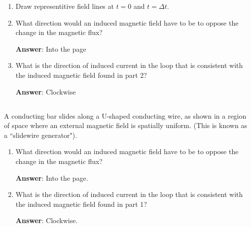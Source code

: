 \documentclass{article}
\begin{document}
\begin{enumerate}

  \item Draw representitive field lines at $t=0$ and $t=\Delta t$.

        \ifsolutions

        \else

        
        \fi

  \item What direction would an induced magnetic field have to be to oppose the change in the magnetic flux?

        \ifsolutions
        {\bf Answer}: Into the page
        \else

        \fi

  \item What is the direction of induced current in the loop that is consistent with the induced magnetic field found in part 2?

        \ifsolutions
        {\bf Answer}: Clockwise
        \else
        \fi

\end{enumerate}

\subsection{}

A conducting bar slides along a U-shaped conducting wire, as shown in a region of space where an external magnetic field is spatially uniform. (This is known as a ``slidewire generator").



\begin{enumerate}

  \item What direction would an induced magnetic field have to be to oppose the change in the magnetic flux?

        \ifsolutions
        {\bf Answer}: Into the page.
        \else

        \fi

  \item What is the direction of induced current in the loop that is consistent with the induced magnetic field found in part 1?

        \ifsolutions
        {\bf Answer}: Clockwise.
        \else

        \fi

\end{enumerate}
\end{document}
